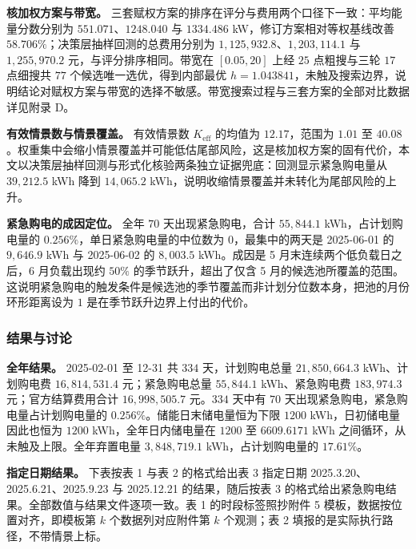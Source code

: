 \textbf{核加权方案与带宽。} 三套赋权方案的排序在评分与费用两个口径下一致：平均能量分数分别为 $551.071$、$1248.040$ 与 $1334.486$ kW，修订方案相对等权基线改善 $58.706\%$；决策层抽样回测的总费用分别为 $1{,}125{,}932.8$、$1{,}203{,}114.1$ 与 $1{,}255{,}970.2$ 元，与评分排序相同。带宽在 $[0.05,20]$ 上经 $25$ 点粗搜与三轮 $17$ 点细搜共 $77$ 个候选唯一选优，得到内部最优 $h=1.043841$，未触及搜索边界，说明结论对赋权方案与带宽的选择不敏感。带宽搜索过程与三套方案的全部对比数据详见附录 D。

\textbf{有效情景数与情景覆盖。} 有效情景数 $K_{\mathrm{eff}}$ 的均值为 $12.17$，范围为 $1.01$ 至 $40.08$。权重集中会缩小情景覆盖并可能低估尾部风险，这是核加权方案的固有代价，本文以决策层抽样回测与形式化核验两条独立证据兜底：回测显示紧急购电量从 $39{,}212.5$ kWh 降到 $14{,}065.2$ kWh，说明收缩情景覆盖并未转化为尾部风险的上升。

\textbf{紧急购电的成因定位。} 全年 $70$ 天出现紧急购电，合计 $55{,}844.1$ kWh，占计划购电量的 $0.256\%$，单日紧急购电量的中位数为 $0$，最集中的两天是 2025-06-01 的 $9{,}646.9$ kWh 与 2025-06-02 的 $8{,}003.5$ kWh。成因是 5 月末连续两个低负载日之后，6 月负载出现约 $50\%$ 的季节跃升，超出了仅含 5 月的候选池所覆盖的范围。这说明紧急购电的触发条件是候选池的季节覆盖而非计划分位数本身，把池的月份环形距离设为 $1$ 是在季节跃升边界上付出的代价。

\subsubsection{结果与讨论}

\textbf{全年结果。} 2025-02-01 至 12-31 共 $334$ 天，计划购电总量 $21{,}850{,}664.3$ kWh、计划购电费 $16{,}814{,}531.4$ 元；紧急购电总量 $55{,}844.1$ kWh、紧急购电费 $183{,}974.3$ 元；官方结算费用合计 $16{,}998{,}505.7$ 元。$334$ 天中有 $70$ 天出现紧急购电，紧急购电量占计划购电量的 $0.256\%$。储能日末储电量恒为下限 $1200$ kWh，日初储电量因此也恒为 $1200$ kWh，全年日内储电量在 $1200$ 至 $6609.6171$ kWh 之间循环，从未触及上限。全年弃置电量 $3{,}848{,}719.1$ kWh，占计划购电量的 $17.61\%$。

\textbf{指定日期结果。} 下表按表 1 与表 2 的格式给出表 3 指定日期 2025.3.20、2025.6.21、2025.9.23 与 2025.12.21 的结果，随后按表 3 的格式给出紧急购电结果。全部数值与结果文件逐项一致。表 1 的时段标签照抄附件 5 模板，数据按位置对齐，即模板第 $k$ 个数据列对应附件第 $k$ 个观测；表 2 填报的是实际执行路径，不带情景上标。

